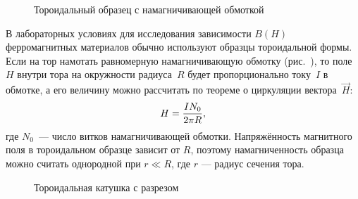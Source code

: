 


\begin{wrapfigure}{o}{0.35\textwidth}
    \centering
    \caption{Тороидальный образец с намагничивающей обмоткой}
\end{wrapfigure}

В лабораторных условиях для исследования зависимости $B(H)$ ферромагнитных
материалов обычно используют образцы тороидальной формы. Если на тор намотать
равномерную намагничивающую обмотку (рис.~), то поле~$H$ внутри
тора на окружности радиуса~$R$ будет пропорционально току~$I$ в обмотке, а его
величину можно рассчитать по теореме о циркуляции вектора~$\vec{H}$:
\begin{equation}
    \eqmark{H-toroid}
    H = \frac{IN_0}{2\pi R},
\end{equation}
где $N_0$~--- число витков намагничивающей обмотки. Напряжённость магнитного
поля в тороидальном образце зависит от $R$, поэтому
намагниченность образца можно считать однородной при $r \ll R$, где $r$ ---
радиус сечения тора.


\begin{wrapfigure}{o}{0.35\textwidth}
    \centering
    \caption{Тороидальная катушка с разрезом}
\end{wrapfigure}

